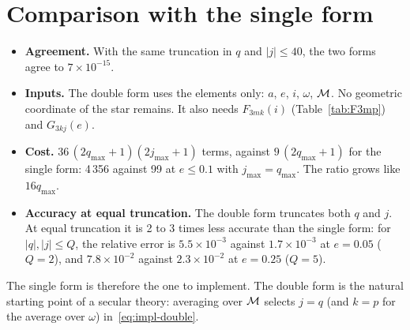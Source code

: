 \section{Comparison with the single form}
\begin{itemize}
  \item \textbf{Agreement.} With the same truncation in $q$ and $|j|\le40$, the two forms agree to $7\times10^{-15}$.
  \item \textbf{Inputs.} The double form uses the elements only: $a$, $e$, $i$, $\omega$, $\mathcal{M}$. No geometric coordinate of the star remains. It also needs $F_{3mk}(i)$ (Table~\ref{tab:F3mp}) and $G_{3kj}(e)$.
  \item \textbf{Cost.} $36\,(2q_{\max}+1)(2j_{\max}+1)$ terms, against $9\,(2q_{\max}+1)$ for the single form: 4\,356 against 99 at $e\le0.1$ with $j_{\max}=q_{\max}$. The ratio grows like $16q_{\max}$.
  \item \textbf{Accuracy at equal truncation.} The double form truncates both $q$ and $j$. At equal truncation it is 2 to 3 times less accurate than the single form: for $|q|,|j|\le Q$, the relative error is $5.5\times10^{-3}$ against $1.7\times10^{-3}$ at $e=0.05$ ($Q=2$), and $7.8\times10^{-2}$ against $2.3\times10^{-2}$ at $e=0.25$ ($Q=5$).
\end{itemize}
The single form is therefore the one to implement. The double form is the natural starting point of a secular theory: averaging over $\mathcal{M}$ selects $j=q$ (and $k=p$ for the average over $\omega$) in~\eqref{eq:impl-double}.
